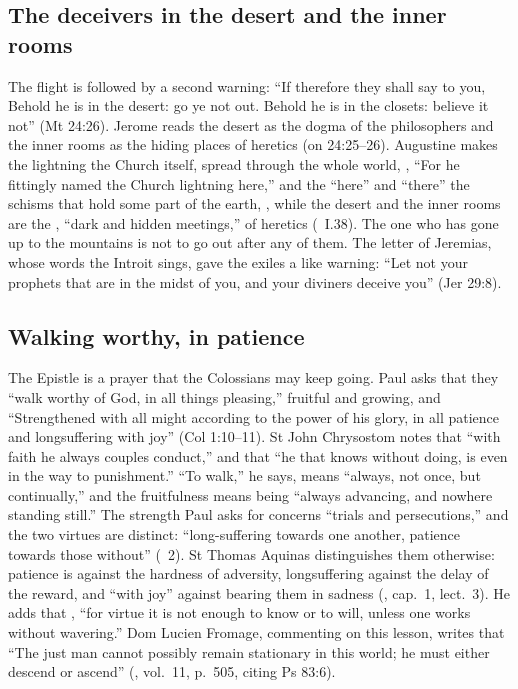 \subsection{The deceivers in the desert and the inner rooms}
\label{sec:flight-deceivers}

The flight is followed by a second warning: ``If therefore they shall say to
you, Behold he is in the desert: go ye not out. Behold he is in the closets:
believe it not'' (Mt 24:26). Jerome reads the desert as the dogma of the
philosophers and the inner rooms as the hiding places of heretics (on
24:25--26). Augustine makes the lightning the Church itself, spread through
the whole world, ,
``For he fittingly named the Church lightning here,'' and the ``here'' and
``there'' the schisms that hold some part of the earth, , while the desert and the inner rooms are the , ``dark and hidden meetings,'' of heretics
(~I.38). The one who has gone up to the
mountains is not to go out after any of them. The letter of Jeremias, whose
words the Introit sings, gave the exiles a like warning: ``Let not your
prophets that are in the midst of you, and your diviners deceive you'' (Jer
29:8).

\subsection{Walking worthy, in patience}
\label{sec:flight-epistle}

The Epistle is a prayer that the Colossians may keep going. Paul asks that
they ``walk worthy of God, in all things pleasing,'' fruitful and growing, and
``Strengthened with all might according to the power of his glory, in all
patience and longsuffering with joy'' (Col 1:10--11). St John Chrysostom notes
that ``with faith he always couples conduct,'' and that ``he that knows
without doing, is even in the way to punishment.'' ``To walk,'' he says, means
``always, not once, but continually,'' and the fruitfulness means being
``always advancing, and nowhere standing still.'' The strength Paul asks for
concerns ``trials and persecutions,'' and the two virtues are distinct:
``long-suffering towards one another, patience towards those without''
(~2). St Thomas Aquinas distinguishes them otherwise:
patience is against the hardness of adversity, longsuffering against the delay
of the reward, and ``with joy'' against bearing them in sadness (, cap.~1, lect.~3). He adds that , ``for virtue it is not enough to
know or to will, unless one works without wavering.'' Dom Lucien Fromage,
commenting on this lesson, writes that ``The just man cannot possibly remain
stationary in this world; he must either descend or ascend'' (, vol.~11, p.~505, citing Ps 83:6).

